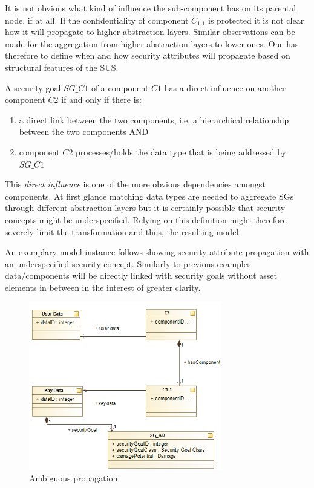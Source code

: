 It is not obvious what kind of influence the sub-component has on its parental node, if at all. If the confidentiality of component $C_{1.1}$ is protected it is not clear how it will propagate to higher abstraction layers. Similar observations can be made for the aggregation from higher abstraction layers to lower ones. One has therefore to define when and how security attributes will propagate based on structural features of the SUS.

\begin{theorem}
A security goal $SG\_C1$ of a component $C1$ has a direct influence on another component $C2$ if and only if there is: 
\begin{enumerate}
\item a direct link between the two components, i.e. a hierarchical relationship between the two components AND
\item component $C2$ processes/holds the data type that is being addressed by $SG\_C1$
\end{enumerate} 
\end{theorem}

This \textit{direct influence} is one of the more obvious dependencies amongst components. At first glance matching data types are needed to aggregate SGs through different abstraction layers but it is certainly possible that security concepts might be underspecified. Relying on this definition might therefore severely limit the transformation and thus, the resulting model.

An exemplary model instance follows showing security attribute propagation with an underspecified security concept. Similarly to previous examples data/components will be directly linked with security goals without asset elements in between in the interest of greater clarity.

\begin{figure}[H]
\centering
\includegraphics[width=0.75\textwidth]{pictures/sg_deduction.png}
\caption{Ambiguous propagation}
\label{fig:subcomponent_dilemma}
\end{figure} 

